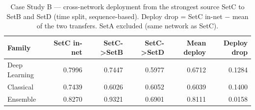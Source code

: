 \begin{table}
\caption{Case Study B --- cross-network deployment from the strongest source SetC to SetB and SetD (time split, sequence-based). Deploy drop = SetC in-net $-$ mean of the two transfers. SetA excluded (same network as SetC).}
\label{tab:q6_cs_deploy}
\begin{tabular}{lrrrrr}
\toprule
Family & SetC in-net & SetC->SetB & SetC->SetD & Mean deploy & Deploy drop \\
\midrule
Deep Learning & 0.7996 & 0.7447 & 0.5977 & 0.6712 & 0.1284 \\
Classical & 0.7439 & 0.6026 & 0.6052 & 0.6039 & 0.1400 \\
Ensemble & 0.8270 & 0.9321 & 0.6901 & 0.8111 & 0.0158 \\
\bottomrule
\end{tabular}
\end{table}
